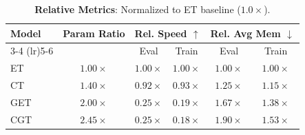 \begin{table}[t]
\begin{subtable}{\linewidth}
\centering
\caption{\textbf{Relative Metrics}: Normalized to ET baseline ($1.0\times$).}
\label{tab:arch_speed_mem_rel}
\setlength{\tabcolsep}{8pt}
\begin{tabular}{l c cc cc}
\toprule
\textbf{Model} & \textbf{Param Ratio} & \multicolumn{2}{c}{\textbf{Rel. Speed} $\uparrow$} & \multicolumn{2}{c}{\textbf{Rel. Avg Mem} $\downarrow$} \\
\cmidrule(lr){3-4} \cmidrule(lr){5-6}
& & Eval & Train & Eval & Train \\
\midrule
ET & $1.00\times$ & $1.00\times$ & $1.00\times$ & $1.00\times$ & $1.00\times$ \\
CT & $1.40\times$ & $0.92\times$ & $0.93\times$ & $1.25\times$ & $1.15\times$ \\
GET & $2.00\times$ & $0.25\times$ & $0.19\times$ & $1.67\times$ & $1.38\times$ \\
CGT & $2.45\times$ & $0.25\times$ & $0.18\times$ & $1.90\times$ & $1.53\times$ \\
\bottomrule
\end{tabular}
\end{subtable}
\end{table}